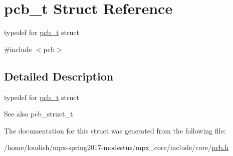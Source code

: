 \hypertarget{structpcb__t}{}\section{pcb\+\_\+t Struct Reference}
\label{structpcb__t}


typedef for \hyperlink{structpcb__t}{pcb\+\_\+t} struct  




{\ttfamily \#include $<$pcb$>$}



\subsection{Detailed Description}
typedef for \hyperlink{structpcb__t}{pcb\+\_\+t} struct 

\begin{DoxySeeAlso}{See also}
pcb\+\_\+struct\+\_\+t 
\end{DoxySeeAlso}


The documentation for this struct was generated from the following file\+:\begin{DoxyCompactItemize}
\item 
/home/loudish/mpx-\/spring2017-\/modestus/mpx\+\_\+core/include/core/\hyperlink{pcb_8h}{pcb.\+h}\end{DoxyCompactItemize}
